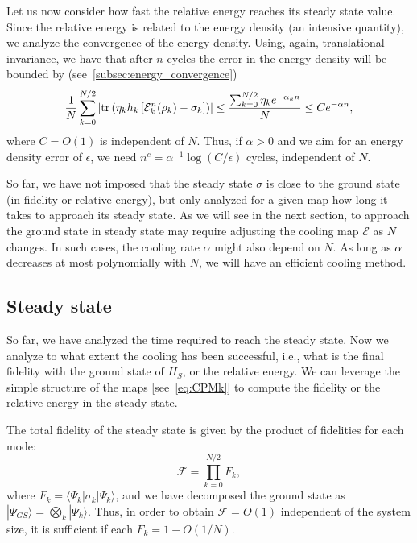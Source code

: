 \documentclass[aps,prx,twocolumn,superscriptaddress,nofootinbib,nolongbibliography,nobalancelastpage,10pt,floatfix]{revtex4-2}
\begin{document}
Let us now consider how fast the relative energy reaches its steady state value. Since the relative energy is related to the energy density (an intensive quantity), we analyze the convergence of the energy density. Using, again, translational invariance, we have that after $n$ cycles the error in the energy density will be bounded by (see~\cref{subsec:energy_convergence})
\begin{equation}
    \frac{1}{N}\sum_{k=0}^{N/2} \left|\operatorname{tr}\left(\eta_k h_k \left[\mathcal{E}_k^n(\rho_k)- \sigma_k\right]\right)\right|\le \frac{\sum_{k=0}^{N/2} \eta_k e^{-\alpha_k n}}{N} \le C e^{- \alpha n},
\end{equation}
where $C=O(1)$ is independent of $N$. Thus, if $\alpha>0$ and we aim for an energy density error of $\epsilon$, we need $n^c=\alpha^{-1}\log(C/\epsilon)$ cycles, independent of $N$.


So far, we have not imposed that the steady state $\sigma$ is close to the ground state (in fidelity or relative energy), but only analyzed for a given map how long it takes to approach its steady state. As we will see in the next section, to approach the ground state in steady state may require adjusting the cooling map $\mathcal{E}$ as $N$ changes. In such cases, the cooling rate $\alpha$ might also depend on $N$. As long as $\alpha$ decreases at most polynomially with $N$, we will have an efficient cooling method.

\subsection{Steady state}
\label{sec:steady-state}

So far, we have analyzed the time required to reach the steady state. Now we analyze to what extent the cooling has been successful, i.e., what is the final fidelity with the ground state of $H_S$, or the relative energy. We can leverage the simple structure of the maps [see~\cref{eq:CPMk}] to compute the fidelity or the relative energy in the steady state.

The total fidelity of the steady state is given by the product of fidelities for each mode:
\begin{equation}
    \mathcal{F}=\prod_{k=0}^{N/2} F_k,
\end{equation}
where $F_k=\langle \Psi_k|\sigma_k|\Psi_k\rangle$, and we have  decomposed the ground state as $|\Psi_{GS}\rangle= \bigotimes_k |\Psi_k\rangle$. Thus, in order to obtain $\mathcal{F}=O(1)$ independent of the system size, it is sufficient if each $F_k=1-O(1/N)$.
\end{document}
